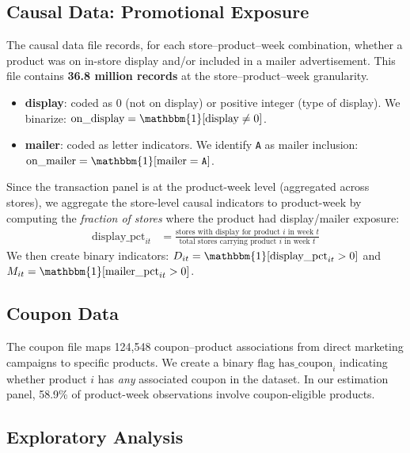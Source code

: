 \documentclass[12pt,a4paper]{article}
\begin{document}
\subsection{Causal Data: Promotional Exposure}

The causal data file records, for each store--product--week
combination, whether a product was on in-store display and/or
included in a mailer advertisement. This file contains
\textbf{36.8 million records} at the store--product--week
granularity.

\begin{itemize}[nosep]
\item \textbf{display}: coded as $0$ (not on display) or positive
integer (type of display). We binarize: $\text{on\_display} =
\mathbbm{1}[\text{display} \neq 0]$.

\item \textbf{mailer}: coded as letter indicators. We identify
\texttt{A} as mailer inclusion:
$\text{on\_mailer} = \mathbbm{1}[\text{mailer} = \texttt{A}]$.
\end{itemize}

Since the transaction panel is at the product-week level (aggregated
across stores), we aggregate the store-level causal indicators to
product-week by computing the \emph{fraction of stores} where the
product had display/mailer exposure:
\begin{align}
\text{display\_pct}_{it} &= \frac{\text{stores with display for
product } i \text{ in week } t}
{\text{total stores carrying product } i \text{ in week } t}
\end{align}
We then create binary indicators:
$D_{it} = \mathbbm{1}[\text{display\_pct}_{it} > 0]$ and
$M_{it} = \mathbbm{1}[\text{mailer\_pct}_{it} > 0]$.

\subsection{Coupon Data}

The coupon file maps 124,548 coupon--product associations from direct
marketing campaigns to specific products. We create a binary flag
$\text{has\_coupon}_i$ indicating whether product $i$ has \emph{any}
associated coupon in the dataset. In our estimation panel, 58.9\% of
product-week observations involve coupon-eligible products.

\subsection{Exploratory Analysis}
\end{document}
